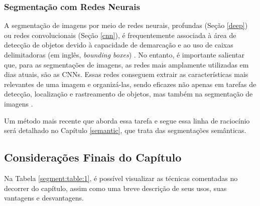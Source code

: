 \subsubsection{Segmentação com Redes Neurais}
\label{segment:neural}

A segmentação de imagens por meio de redes neurais, profundas (Seção \ref{deep}) ou redes convolucionais (Seção \ref{cnn}), é frequentemente associada à área de detecção de objetos devido à capacidade de demarcação e ao uso de caixas delimitadoras (em inglês, \textit{bounding boxes}) \citep{Ghosh2019}. No entanto, é importante salientar que, para as segmentações de imagens, as redes mais amplamente utilizadas em dias atuais, são as CNNs. Essas redes conseguem extrair as características mais relevantes de uma imagem e organizá-las, sendo eficazes não apenas em tarefas de detecção, localização e rastreamento de objetos, mas também na segmentação de imagens \citep{Ghosh2019}.

Um método mais recente que aborda essa tarefa e segue essa linha de raciocínio será detalhado no Capítulo \ref{semantic}, que trata das segmentações semânticas.

\subsection{Considerações Finais do Capítulo}
\label{segment:conclusion}

Na Tabela \ref{segment:table:1}, é possível visualizar as técnicas comentadas no decorrer do capítulo, assim como uma breve descrição de seus usos, suas vantagens e desvantagens.


